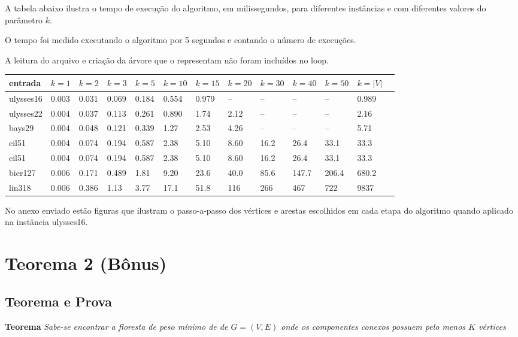 \documentclass[a4paper]{article}
\begin{document}
A tabela abaixo ilustra o tempo de execução do algoritmo, em milissegundos, para diferentes instâncias e com diferentes valores do parâmetro $k$.

O tempo foi medido executando o algoritmo por 5 segundos e contando o número de execuções.

A leitura do arquivo e criação da árvore que o representam não foram incluídos no loop.

\begin{table}[H]
\centering
\begin{tabular}{l|l|l|l|l|l|l|l|l|l|l|l|l}
entrada & $k=1$ & $k=2$ & $k=3$ & $k=5$ & $k=10$ & $k=15$ & $k=20$ & $k=30$ & $k=40$ & $k=50$ & $k=|V|$ \\\hline
ulysses16 & 0.003 & 0.031 & 0.069 & 0.184 & 0.554 & 0.979 & -- & -- & -- & -- & 0.989 \\
ulysses22 & 0.004 & 0.037 & 0.113 & 0.261 & 0.890 & 1.74 & 2.12 & -- & -- & -- & 2.16 \\
bays29 & 0.004 & 0.048 & 0.121 & 0.339 & 1.27 & 2.53 & 4.26 & -- & -- & -- & 5.71 \\
eil51 & 0.004 & 0.074 & 0.194 & 0.587 & 2.38 & 5.10 & 8.60 & 16.2 & 26.4 & 33.1 & 33.3 \\
eil51 & 0.004 & 0.074 & 0.194 & 0.587 & 2.38 & 5.10 & 8.60 & 16.2 & 26.4 & 33.1 & 33.3 \\
bier127 & 0.006 & 0.171 & 0.489 & 1.81 & 9.20 & 23.6 & 40.0 & 85.6 & 147.7 & 206.4 & 680.2 \\
lin318 & 0.006 & 0.386 & 1.13 & 3.77 & 17.1 & 51.8 & 116 & 266 & 467 & 722 & 9837 \\

\end{tabular}
\end{table}

No anexo enviado estão figuras que ilustram o passo-a-passo dos vértices e arestas escolhidos em cada etapa do algoritmo quando aplicado na instância ulysses16.


\section*{Teorema 2 (Bônus)}

\subsection*{Teorema e Prova}

\textbf{Teorema} \:
\textit{Sabe-se encontrar a floresta de peso mínimo de de $G=(V,E)$ onde os componentes conexos possuem pelo menos $K$ vértices}
\end{document}
